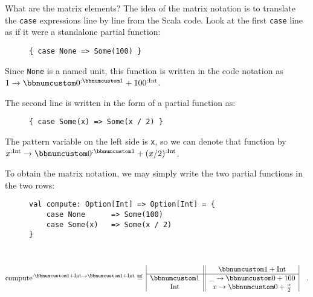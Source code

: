 What are the matrix elements? The idea of the matrix notation is to
translate the \lstinline!case! expressions line by line from the
Scala code. Look at the first \lstinline!case! line as if it were
a standalone partial function:

\begin{wrapfigure}{l}{0.45\columnwidth}%
\vspace{-0.85\baselineskip}
\begin{lstlisting}
{ case None => Some(100) }
\end{lstlisting}

\vspace{-0.75\baselineskip}
\end{wrapfigure}%

\noindent Since \lstinline!None! is a named unit, this function is
written in the code notation as $1\rightarrow\bbnum 0^{:\bbnum 1}+100^{:\text{Int}}$. 

The second line is written in the form of a partial function as:

\begin{wrapfigure}{l}{0.45\columnwidth}%
\vspace{-0.85\baselineskip}
\begin{lstlisting}
{ case Some(x) => Some(x / 2) }
\end{lstlisting}

\vspace{-0.75\baselineskip}
\end{wrapfigure}%

\noindent The pattern variable on the left side is \lstinline!x!,
so we can denote that function by $x^{:\text{Int}}\rightarrow\bbnum 0^{:\bbnum 1}+(x/2)^{:\text{Int}}$. 

To obtain the matrix notation, we may simply write the two partial
functions in the two rows:

\begin{wrapfigure}{l}{0.45\columnwidth}%
\vspace{-0.85\baselineskip}
\begin{lstlisting}
val compute: Option[Int] => Option[Int] = {
    case None      => Some(100)
    case Some(x)   => Some(x / 2)
}
\end{lstlisting}

\vspace{-0.75\baselineskip}
\end{wrapfigure}%

~\vspace{-1.35\baselineskip}
\[
\text{compute}^{:\bbnum 1+\text{Int}\rightarrow\bbnum 1+\text{Int}}\triangleq\,\begin{array}{|c||c|}
 & \bbnum 1+\text{Int}\\
\hline \bbnum 1 & \_\rightarrow\bbnum 0+100\\
\text{Int} & x\rightarrow\bbnum 0+\frac{x}{2}
\end{array}\quad.
\]
\vspace{-0.9\baselineskip}

